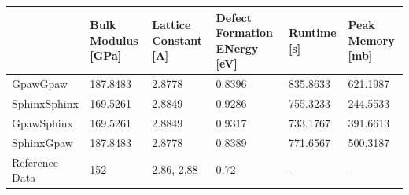\begin{tabular}{llllll}
\toprule
 & Bulk Modulus [GPa] & Lattice Constant [A] & Defect Formation ENergy [eV] & Runtime [s] & Peak Memory [mb] \\
\midrule
GpawGpaw & 187.8483 & 2.8778 & 0.8396 & 835.8633 & 621.1987 \\
SphinxSphinx & 169.5261 & 2.8849 & 0.9286 & 755.3233 & 244.5533 \\
GpawSphinx & 169.5261 & 2.8849 & 0.9317 & 733.1767 & 391.6613 \\
SphinxGpaw & 187.8483 & 2.8778 & 0.8389 & 771.6567 & 500.3187 \\
Reference Data & 152 & 2.86, 2.88 & 0.72 & - & - \\
\bottomrule
\end{tabular}
